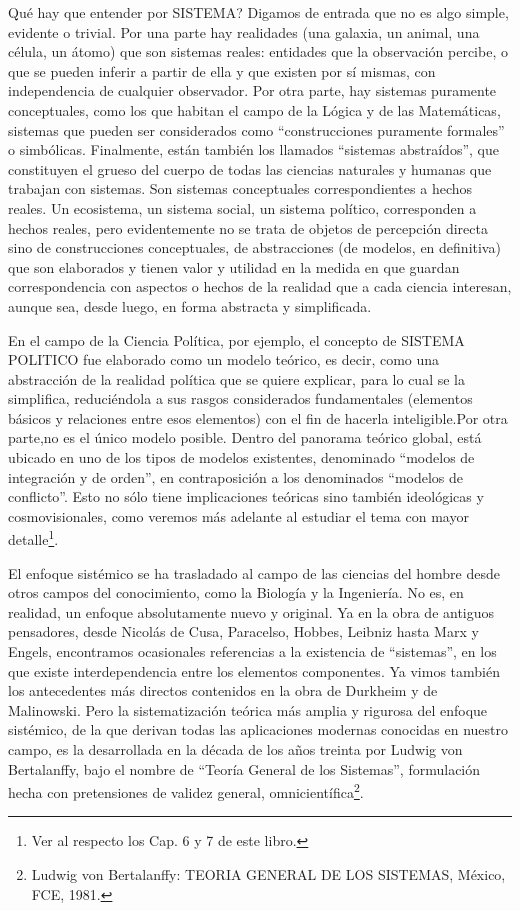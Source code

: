 \documentclass[
]{book}
\begin{document}
Qué hay que entender por SISTEMA? Digamos de entrada que no es algo simple, evidente o trivial. Por una parte hay realidades (una galaxia, un animal, una célula, un átomo) que son sistemas reales: entidades que la observación percibe, o que se pueden inferir a partir de ella y que existen por sí mismas, con independencia de cualquier observador. Por otra parte, hay sistemas puramente conceptuales, como los que habitan el campo de la Lógica y de las Matemáticas, sistemas que pueden ser considerados como ``construcciones puramente formales'' o simbólicas. Finalmente, están también los llamados ``sistemas abstraídos'', que constituyen el grueso del cuerpo de todas las ciencias naturales y humanas que trabajan con sistemas. Son sistemas conceptuales correspondientes a hechos reales. Un ecosistema, un sistema social, un sistema político, corresponden a hechos reales, pero evidentemente no se trata de objetos de percepción directa sino de construcciones conceptuales, de abstracciones (de modelos, en definitiva) que son elaborados y tienen valor y utilidad en la medida en que guardan correspondencia con aspectos o hechos de la realidad que a cada ciencia interesan, aunque sea, desde luego, en forma abstracta y simplificada.

En el campo de la Ciencia Política, por ejemplo, el concepto de SISTEMA POLITICO fue elaborado como un modelo teórico, es decir, como una abstracción de la realidad política que se quiere explicar, para lo cual se la simplifica, reduciéndola a sus rasgos considerados fundamentales (elementos básicos y relaciones entre esos elementos) con el fin de hacerla inteligible.Por otra parte,no es el único modelo posible. Dentro del panorama teórico global, está ubicado en uno de los tipos de modelos existentes, denominado ``modelos de integración y de orden'', en contraposición a los denominados ``modelos de conflicto''. Esto no sólo tiene implicaciones teóricas sino también ideológicas y cosmovisionales, como veremos más adelante al estudiar el tema con mayor detalle\footnote{Ver al respecto los Cap. 6 y 7 de este libro.}.

El enfoque sistémico se ha trasladado al campo de las ciencias del hombre desde otros campos del conocimiento, como la Biología y la Ingeniería. No es, en realidad, un enfoque absolutamente nuevo y original. Ya en la obra de antiguos pensadores, desde Nicolás de Cusa, Paracelso, Hobbes, Leibniz hasta Marx y Engels, encontramos ocasionales referencias a la existencia de ``sistemas'', en los que existe interdependencia entre los elementos componentes. Ya vimos también los antecedentes más directos contenidos en la obra de Durkheim y de Malinowski. Pero la sistematización teórica más amplia y rigurosa del enfoque sistémico, de la que derivan todas las aplicaciones modernas conocidas en nuestro campo, es la desarrollada en la década de los años treinta por Ludwig von Bertalanffy, bajo el nombre de ``Teoría General de los Sistemas'', formulación hecha con pretensiones de validez general, omnicientífica\footnote{Ludwig von Bertalanffy: TEORIA GENERAL DE LOS SISTEMAS, México, FCE, 1981.}.
\end{document}

